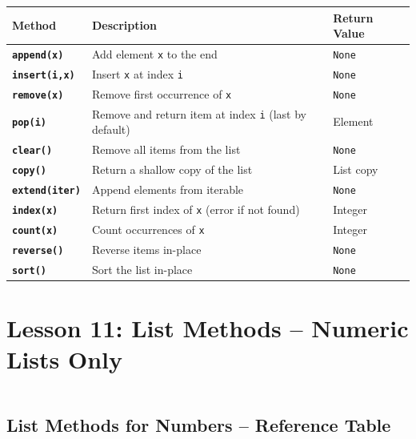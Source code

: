 \documentclass[a4paper,11pt]{article}
\begin{document}
	\begin{tabular}{>{\bfseries}p{3.5cm} p{6cm} p{3.5cm}}
		\toprule
		Method & Description & Return Value \\
		\midrule
		
		\texttt{append(x)}   & Add element \texttt{x} to the end & \texttt{None} \\
		\texttt{insert(i,x)} & Insert \texttt{x} at index \texttt{i} & \texttt{None} \\
		\texttt{remove(x)}   & Remove first occurrence of \texttt{x} & \texttt{None} \\
		\texttt{pop(i)}      & Remove and return item at index \texttt{i} (last by default) & Element \\
		\texttt{clear()}     & Remove all items from the list & \texttt{None} \\
		\texttt{copy()}      & Return a shallow copy of the list & List copy \\
		\texttt{extend(iter)}& Append elements from iterable & \texttt{None} \\
		\texttt{index(x)}    & Return first index of \texttt{x} (error if not found) & Integer \\
		\texttt{count(x)}    & Count occurrences of \texttt{x} & Integer \\
		\texttt{reverse()}   & Reverse items in-place & \texttt{None} \\
		\texttt{sort()}      & Sort the list in-place & \texttt{None} \\
		
		\bottomrule
	\end{tabular}
	
	
	
	\section{Lesson 11: List Methods – Numeric Lists Only}
	\inputminted{python}{Python_Files/list_methods_numeric.py}
	
	\vspace{1em}
	\subsection*{List Methods for Numbers – Reference Table}
	
\end{document}
